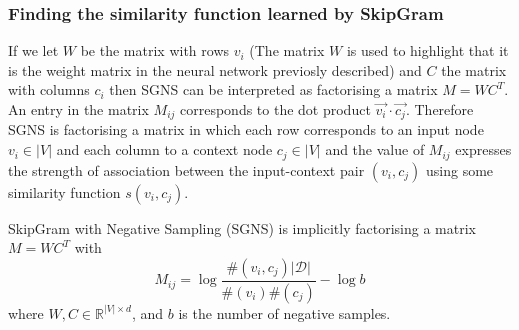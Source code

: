\documentclass[a4paper]{article}
\begin{document}
\subsubsection{Finding the similarity function learned by SkipGram}

If we let $W$ be the matrix with rows $v_i$ (The matrix $W$ is used to highlight
that it is the weight matrix in the neural network previosly described) and $C$ the matrix with columns
$c_i$ then SGNS can be interpreted as factorising a matrix $M = WC^T$. An entry in the matrix $M_{ij}$ corresponds to the dot product $\vec{v_i} \cdot
\vec{c_j}$. Therefore SGNS is factorising a matrix in which each row corresponds
to an input node $v_i \in |V|$ and each column to a context node $c_j \in |V|$ and the value of $M_{ij}$ expresses the
strength of association between the input-context pair $(v_i, c_j)$ using some similarity
function $s(v_i,c_j)$. 
\begin{theorem}
  SkipGram with Negative Sampling (SGNS) is implicitly factorising a matrix $M =
  WC^T$ with
  \[M_{ij} = \log{\frac{\#(v_i,c_j)|\mathcal{D}|}{\#(v_i)\#(c_j)}} - \log{b}\]
  where $W, C \in \mathbb{R}^{|V| \times d}$, and $b$ is the number of negative samples.
\end{theorem}
\end{document}
